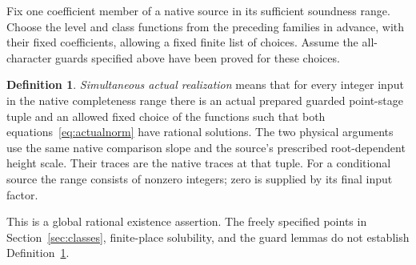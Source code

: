 \documentclass[11pt,a4paper]{article}
\theoremstyle{definition}\newtheorem{definition}[theorem]{Definition}
\begin{document}
Fix one coefficient member of a native source in its sufficient
soundness range. Choose the level and class functions from the preceding families
in advance, with their fixed coefficients, allowing a fixed finite
list of choices. Assume the all-character guards specified above have been
proved for these choices.

\begin{definition}\label{def:realization}
\emph{Simultaneous actual realization} means that for every integer
input in the native completeness range there is an actual prepared
guarded point-stage tuple and an allowed fixed choice of the functions
such that both equations~\eqref{eq:actualnorm} have rational solutions.
The two physical arguments use the same native comparison slope and
the source's prescribed root-dependent height scale. Their traces
are the native traces at that tuple. For a conditional source the
range consists of nonzero integers; zero is supplied by its final
input factor.
\end{definition}

This is a global rational existence assertion. The freely specified
points in Section~\ref{sec:classes}, finite-place solubility, and the guard lemmas do
not establish Definition~\ref{def:realization}.
\end{document}
